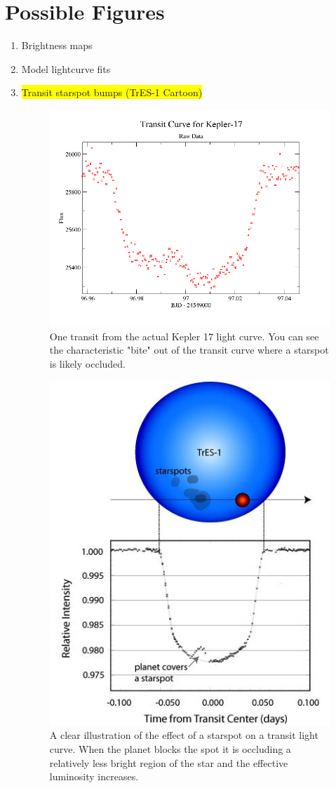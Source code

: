 \documentclass[iop]{emulateapj}
\newcommand{\hilight}[1]{\colorbox{yellow}{#1}}
\begin{document}
\section{Possible Figures \label{figures}}
	\begin{enumerate}
		\item Brightness maps
		\item Model lightcurve fits
		\item \hilight{Transit starspot bumps (TrES-1 Cartoon)}
			\begin{figure}[h]
				\centering
				\includegraphics[width=.5\textwidth]{images/k17trans.png}
				\caption{One transit from the actual Kepler 17 light curve. You can see the characteristic "bite" out of the transit curve where a starspot is likely occluded.}
				\label{k17trans}
			\end{figure}
			\begin{figure}[h]
				\centering
				\includegraphics[width=.5\textwidth]{images/tres1hst.jpg}
				\caption{A clear illustration of the effect of a starspot on a transit light curve. When the planet blocks the spot it is occluding a relatively less bright region of the star and the effective luminosity increases.}
				\label{tres1}
			\end{figure}

\end{enumerate}
\end{document}
